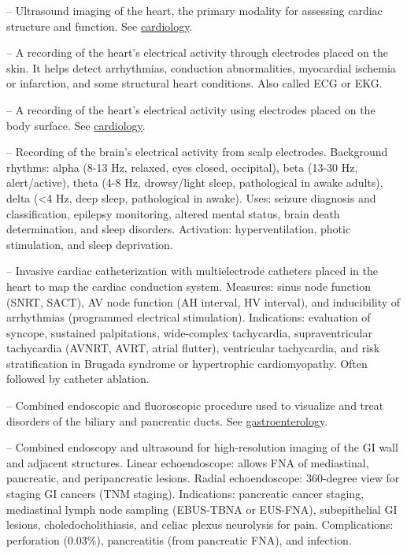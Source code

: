 -- Ultrasound imaging of the heart, the primary modality for assessing cardiac structure and function. See \hyperlink{Cardiology}{cardiology}.

-- A recording of the heart's electrical activity through electrodes placed on the skin. It helps detect arrhythmias, conduction abnormalities, myocardial ischemia or infarction, and some structural heart conditions. Also called ECG or EKG.

-- A recording of the heart's electrical activity using electrodes placed on the body surface. See \hyperlink{Cardiology}{cardiology}.

-- Recording of the brain's electrical activity from scalp electrodes. Background rhythms: alpha (8-13 Hz, relaxed, eyes closed, occipital), beta (13-30 Hz, alert/active), theta (4-8 Hz, drowsy/light sleep, pathological in awake adults), delta (<4 Hz, deep sleep, pathological in awake). Uses: seizure diagnosis and classification, epilepsy monitoring, altered mental status, brain death determination, and sleep disorders. Activation: hyperventilation, photic stimulation, and sleep deprivation.

-- Invasive cardiac catheterization with multielectrode catheters placed in the heart to map the cardiac conduction system. Measures: sinus node function (SNRT, SACT), AV node function (AH interval, HV interval), and inducibility of arrhythmias (programmed electrical stimulation). Indications: evaluation of syncope, sustained palpitations, wide-complex tachycardia, supraventricular tachycardia (AVNRT, AVRT, atrial flutter), ventricular tachycardia, and risk stratification in Brugada syndrome or hypertrophic cardiomyopathy. Often followed by catheter ablation.

-- Combined endoscopic and fluoroscopic procedure used to visualize and treat disorders of the biliary and pancreatic ducts. See \hyperlink{Gastroenterology}{gastroenterology}.

-- Combined endoscopy and ultrasound for high-resolution imaging of the GI wall and adjacent structures. Linear echoendoscope: allows FNA of mediastinal, pancreatic, and peripancreatic lesions. Radial echoendoscope: 360-degree view for staging GI cancers (TNM staging). Indications: pancreatic cancer staging, mediastinal lymph node sampling (EBUS-TBNA or EUS-FNA), subepithelial GI lesions, choledocholithiasis, and celiac plexus neurolysis for pain. Complications: perforation (0.03\%), pancreatitis (from pancreatic FNA), and infection.

